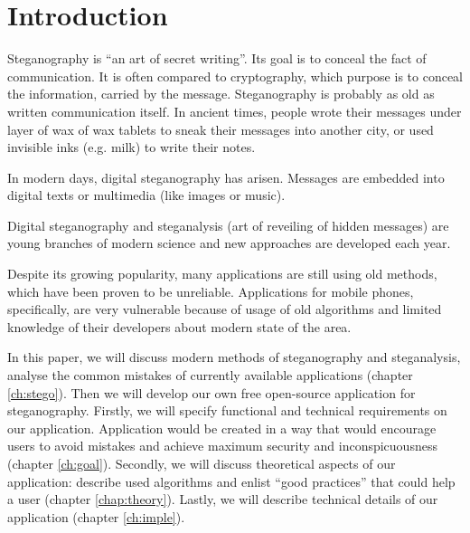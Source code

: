 \chapter*{Introduction}

Steganography is ``an art of secret writing''. Its goal is 
to conceal the fact of communication. It is often compared
to cryptography, which purpose is to conceal the information,
carried by the message. Steganography is probably as old as written
communication itself. In ancient times, people wrote their messages
under layer of wax of wax tablets to sneak their messages into another
city, or used invisible inks (e.g. milk) to write their notes.

In modern days, digital steganography has arisen. Messages are embedded
into digital texts or multimedia (like images or music).

Digital steganography and steganalysis (art of reveiling of hidden messages) 
are young branches of modern science and new approaches are developed each year.

Despite its growing popularity, many applications are still using old methods,
which have been proven to be unreliable. Applications for mobile phones, specifically,
are very vulnerable because of usage of old algorithms and limited knowledge of their
developers about modern state of the area.

In this paper, we will discuss modern methods of steganography and steganalysis, analyse
the common mistakes of currently available applications (chapter \ref{ch:stego}). Then we
will develop our own free open-source application for steganography. Firstly, we will specify
functional and technical requirements on our application. Application would be created in a way
that would encourage users to avoid mistakes and achieve maximum security and inconspicuousness
(chapter \ref{ch:goal}). Secondly, we will discuss theoretical aspects of our application: describe
used algorithms and enlist ``good practices'' that could help a user (chapter \ref{chap:theory}).
Lastly, we will describe technical details of our application (chapter \ref{ch:imple}).
